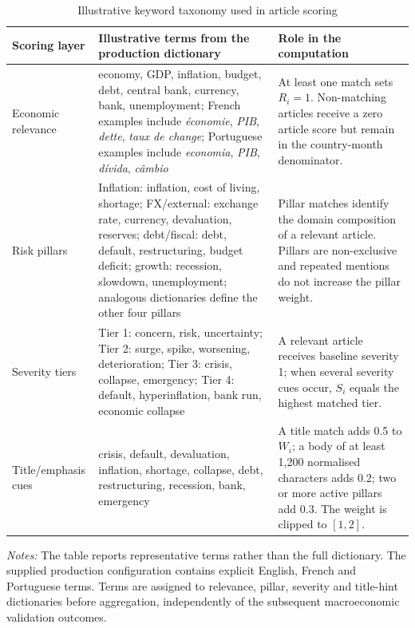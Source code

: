 \begin{table}[H]\centering\small\singlespacing
\caption{Illustrative keyword taxonomy used in article scoring}\label{tab:keyword_example}
\setlength{\tabcolsep}{4pt}
\begin{tabular}{p{2.6cm}p{5.7cm}p{6.1cm}}\toprule
Scoring layer & Illustrative terms from the production dictionary & Role in the computation\\\midrule
Economic relevance & economy, GDP, inflation, budget, debt, central bank, currency, bank, unemployment; French examples include \emph{économie}, \emph{PIB}, \emph{dette}, \emph{taux de change}; Portuguese examples include \emph{economia}, \emph{PIB}, \emph{dívida}, \emph{câmbio} & At least one match sets $R_i=1$. Non-matching articles receive a zero article score but remain in the country-month denominator.\\
Risk pillars & Inflation: inflation, cost of living, shortage; FX/external: exchange rate, currency, devaluation, reserves; debt/fiscal: debt, default, restructuring, budget deficit; growth: recession, slowdown, unemployment; analogous dictionaries define the other four pillars & Pillar matches identify the domain composition of a relevant article. Pillars are non-exclusive and repeated mentions do not increase the pillar weight.\\
Severity tiers & Tier 1: concern, risk, uncertainty; Tier 2: surge, spike, worsening, deterioration; Tier 3: crisis, collapse, emergency; Tier 4: default, hyperinflation, bank run, economic collapse & A relevant article receives baseline severity 1; when several severity cues occur, $S_i$ equals the highest matched tier.\\
Title/emphasis cues & crisis, default, devaluation, inflation, shortage, collapse, debt, restructuring, recession, bank, emergency & A title match adds 0.5 to $W_i$; a body of at least 1,200 normalised characters adds 0.2; two or more active pillars add 0.3. The weight is clipped to $[1,2]$.\\
\bottomrule\end{tabular}
\begin{singlespace}\footnotesize\raggedright
\textit{Notes:} The table reports representative terms rather than the full dictionary. The supplied production configuration contains explicit English, French and Portuguese terms. Terms are assigned to relevance, pillar, severity and title-hint dictionaries before aggregation, independently of the subsequent macroeconomic validation outcomes.
\end{singlespace}
\end{table}

